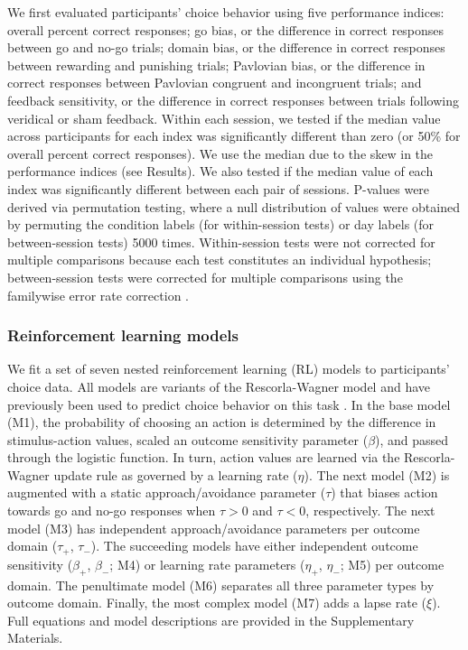 \documentclass[a4paper,12pt]{article}
\begin{document}
\begin{refsection}[main]
We first evaluated participants' choice behavior using five performance indices: overall percent correct responses; go bias, or the difference in correct responses between go and no-go trials; domain bias, or the difference in correct responses between rewarding and punishing trials; Pavlovian bias, or the difference in correct responses between Pavlovian congruent and incongruent trials; and feedback sensitivity, or the difference in correct responses between trials following veridical or sham feedback. Within each session, we tested if the median value across participants for each index was significantly different than zero (or 50\% for overall percent correct responses). We use the median due to the skew in the performance indices (see Results). We also tested if the median value of each index was significantly different between each pair of sessions. P-values were derived via permutation testing, where a null distribution of values were obtained by permuting the condition labels (for within-session tests) or day labels (for between-session tests) 5000 times. Within-session tests were not corrected for multiple comparisons because each test constitutes an individual hypothesis; between-session tests were corrected for multiple comparisons using the familywise error rate correction \cite{winkler2014permutation}.

\subsubsection*{Reinforcement learning models}

We fit a set of seven nested reinforcement learning (RL) models to participants' choice data. All models are variants of the Rescorla-Wagner model and have previously been used to predict choice behavior on this task \cite{guitart2012go, mkrtchian2017modeling}. In the base model (M1), the probability of choosing an action is determined by the difference in stimulus-action values, scaled an outcome sensitivity parameter ($\beta$), and passed through the logistic function. In turn, action values are learned via the Rescorla-Wagner update rule as governed by a learning rate ($\eta$). The next model (M2) is augmented with a static approach/avoidance parameter ($\tau$) that biases action towards go and no-go responses when $\tau > 0$ and $\tau < 0$, respectively. The next model (M3) has independent approach/avoidance parameters per outcome domain ($\tau_+$, $\tau_-$). The succeeding models have either independent outcome sensitivity  ($\beta_+$, $\beta_-$; M4) or learning rate parameters ($\eta_+$, $\eta_-$; M5) per outcome domain. The penultimate model (M6) separates all three parameter types by outcome domain. Finally, the most complex model (M7) adds a lapse rate ($\xi$). Full equations and model descriptions are provided in the Supplementary Materials.


\end{refsection}
\end{document}
